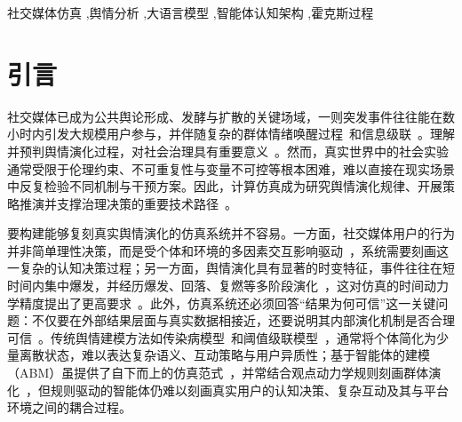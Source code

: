 \documentclass[a4paper,fleqn]{cas-dc}
\begin{document}

\begin{keywords}
社交媒体仿真 \sep 舆情分析 \sep 大语言模型 \sep 智能体认知架构 \sep 霍克斯过程
\end{keywords}

\maketitle

\section{引言}\label{sec:intro}

社交媒体已成为公共舆论形成、发酵与扩散的关键场域，一则突发事件往往能在数小时内引发大规模用户参与，并伴随复杂的群体情绪唤醒过程~\citep{gonzalez_emotional_2010}和信息级联~\citep{goldstein_structure_2012}。理解并预判舆情演化过程，对社会治理具有重要意义~\citep{WU2025127823}。然而，真实世界中的社会实验通常受限于伦理约束、不可重复性与变量不可控等根本困难，难以直接在现实场景中反复检验不同机制与干预方案。因此，计算仿真成为研究舆情演化规律、开展策略推演并支撑治理决策的重要技术路径~\citep{bonabeau_agent-based_2002}。

要构建能够复刻真实舆情演化的仿真系统并不容易。一方面，社交媒体用户的行为并非简单理性决策，而是受个体和环境的多因素交互影响驱动~\citep{buckels2014trolls}，系统需要刻画这一复杂的认知决策过程；另一方面，舆情演化具有显著的时变特征，事件往往在短时间内集中爆发，并经历爆发、回落、复燃等多阶段演化~\citep{ZHOU2024121307}，这对仿真的时间动力学精度提出了更高要求~\citep{zhao_seismic_2015}。此外，仿真系统还必须回答“结果为何可信”这一关键问题：不仅要在外部结果层面与真实数据相接近，还要说明其内部演化机制是否合理可信~\citep{mcculloch_calibrating_2022}。传统舆情建模方法如传染病模型~\citep{daley_stochastic_1965}和阈值级联模型~\citep{granovetter_threshold_1978}，通常将个体简化为少量离散状态，难以表达复杂语义、互动策略与用户异质性；基于智能体的建模（ABM）虽提供了自下而上的仿真范式~\citep{macal_tutorial_2010}，并常结合观点动力学规则刻画群体演化~\citep{castellano_statistical_2009}，但规则驱动的智能体仍难以刻画真实用户的认知决策、复杂互动及其与平台环境之间的耦合过程。
\end{document}
